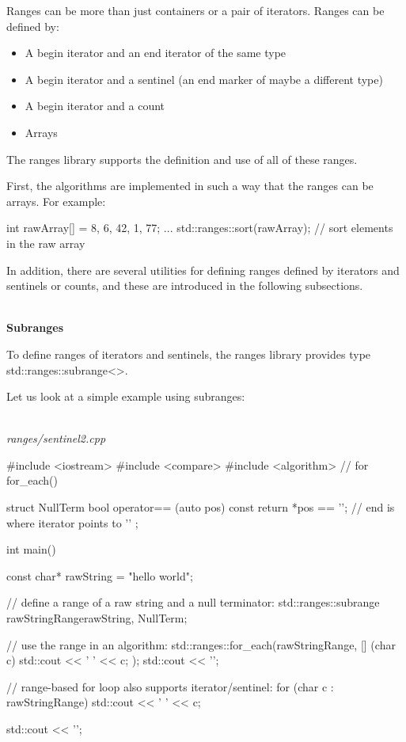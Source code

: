 Ranges can be more than just containers or a pair of iterators. Ranges can be defined by:

\begin{itemize}
\item
A begin iterator and an end iterator of the same type

\item
A begin iterator and a sentinel (an end marker of maybe a different type)

\item
A begin iterator and a count

\item
Arrays
\end{itemize}

The ranges library supports the definition and use of all of these ranges.

First, the algorithms are implemented in such a way that the ranges can be arrays. For example:

\begin{cpp}
int rawArray[] = {8, 6, 42, 1, 77};
...
std::ranges::sort(rawArray); // sort elements in the raw array
\end{cpp}

In addition, there are several utilities for defining ranges defined by iterators and sentinels or counts, and these are introduced in the following subsections.

\noindent
\hspace*{\fill} \\ %
\textbf{Subranges}

To define ranges of iterators and sentinels, the ranges library provides type std::ranges::subrange<>.

Let us look at a simple example using subranges:

\noindent
\hspace*{\fill} \\ %
\textit{ranges/sentinel2.cpp}

\begin{cpp}
#include <iostream>
#include <compare>
#include <algorithm> // for for_each()

struct NullTerm {
	bool operator== (auto pos) const {
		return *pos == '\0'; // end is where iterator points to ’\0’
	}
};

int main()
{
	const char* rawString = "hello world";
	
	// define a range of a raw string and a null terminator:
	std::ranges::subrange rawStringRange{rawString, NullTerm{}};
	
	// use the range in an algorithm:
	std::ranges::for_each(rawStringRange,
	[] (char c) {
		std::cout << ' ' << c;
	});
	std::cout << '\n';
	
	// range-based for loop also supports iterator/sentinel:
	for (char c : rawStringRange) {
		std::cout << ' ' << c;
	}
	
	std::cout << '\n';
}
\end{cpp}


